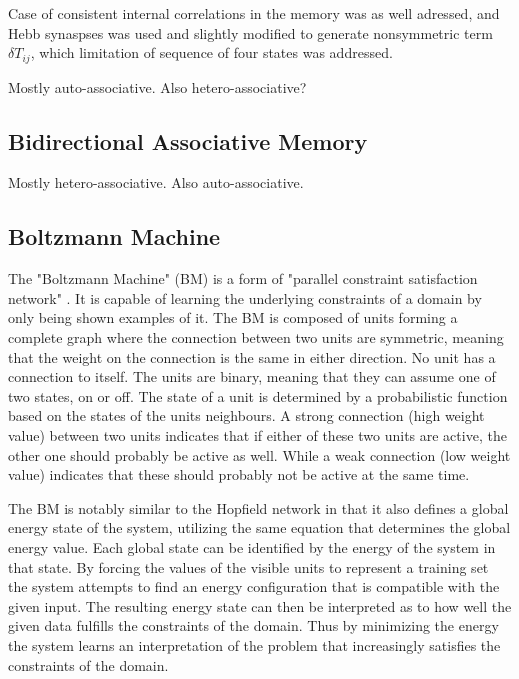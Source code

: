\documentclass[12pt, a4paper]{article}
\begin{document}
Case of consistent internal correlations in the memory was as well adressed, and Hebb synaspses was used and slightly modified to generate nonsymmetric term~$\delta T_{ij}$, which limitation of sequence of four states was addressed.

Mostly auto-associative. Also hetero-associative?

\subsection{Bidirectional Associative Memory}

Mostly hetero-associative. Also auto-associative.

\subsection{Boltzmann Machine}


The "Boltzmann Machine" (BM) is a form of "parallel constraint satisfaction network" \cite{ackley1985learning}. It is capable of learning the underlying constraints of a domain by only being shown examples of it. The BM is composed of units forming a complete graph where the connection between two units are symmetric, meaning that the weight on the connection is the same in either direction. No unit has a connection to itself. The units are binary, meaning that they can assume one of two states, on or off. The state of a unit is determined by a probabilistic function based on the states of the units neighbours. A strong connection (high weight value) between two units indicates that if either of these two units are active, the other one should probably be active as well. While a weak connection (low weight value) indicates that these should probably not be active at the same time.

The BM is notably similar to the Hopfield network in that it also defines a global energy state of the system, utilizing the same equation that determines the global energy value. Each global state can be identified by the energy of the system in that state. By forcing the values of the visible units to represent a training set the system attempts to find an energy configuration that is compatible with the given input. The resulting energy state can then be interpreted as to how well the given data fulfills the constraints of the domain. Thus by minimizing the energy the system learns an interpretation of the problem that increasingly satisfies the constraints of the domain.
\end{document}
